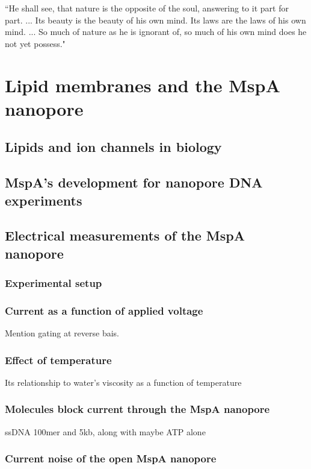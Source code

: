 \begin{savequote}[75mm]
``He shall see, that nature is the opposite of the soul, answering to it part for part. ... Its beauty is the beauty of his own mind. Its laws are the laws of his own mind. ... So much of nature as he is ignorant of, so much of his own mind does he not yet possess."
\end{savequote}

\chapter{Lipid membranes and the MspA nanopore}
\label{2_lipids_mspa}

\section{Lipids and ion channels in biology}

\section{MspA's development for nanopore DNA experiments}

\section{Electrical measurements of the MspA nanopore}

\subsection{Experimental setup}

\subsection{Current as a function of applied voltage}

Mention gating at reverse bais.

\subsection{Effect of temperature}

Its relationship to water's viscosity as a function of temperature

\subsection{Molecules block current through the MspA nanopore}

ssDNA 100mer and 5kb, along with maybe ATP alone

\subsection{Current noise of the open MspA nanopore}
